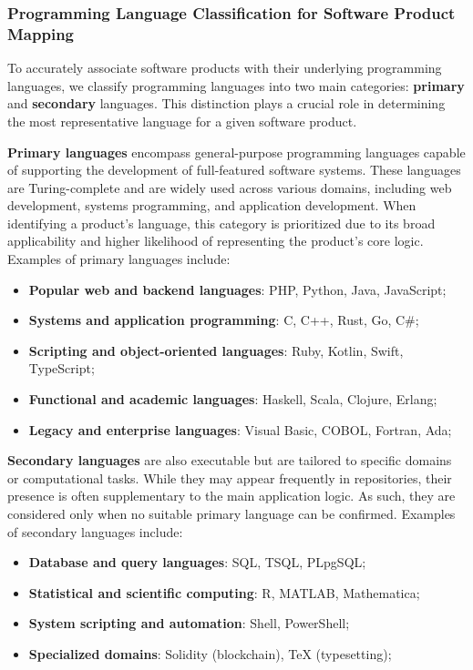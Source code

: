\subsubsection{Programming Language Classification for Software Product Mapping}
To accurately associate software products with their underlying programming languages, we classify programming languages into two main categories: \textbf{primary} and \textbf{secondary} languages. This distinction plays a crucial role in determining the most representative language for a given software product.

\textbf{Primary languages} encompass general-purpose programming languages capable of supporting the development of full-featured software systems. These languages are Turing-complete and are widely used across various domains, including web development, systems programming, and application development. When identifying a product's language, this category is prioritized due to its broad applicability and higher likelihood of representing the product's core logic. Examples of primary languages include: 

\begin{itemize}
    \item \textbf{Popular web and backend languages}: PHP, Python, Java, JavaScript;
    \item \textbf{Systems and application programming}: C, C++, Rust, Go, C\#;
    \item \textbf{Scripting and object-oriented languages}: Ruby, Kotlin, Swift, TypeScript;
    \item \textbf{Functional and academic languages}: Haskell, Scala, Clojure, Erlang;
    \item \textbf{Legacy and enterprise languages}: Visual Basic, COBOL, Fortran, Ada;
\end{itemize}

\textbf{Secondary languages} are also executable but are tailored to specific domains or computational tasks. While they may appear frequently in repositories, their presence is often supplementary to the main application logic. As such, they are considered only when no suitable primary language can be confirmed. Examples of secondary languages include:

\begin{itemize}
    \item \textbf{Database and query languages}: SQL, TSQL, PLpgSQL;
    \item \textbf{Statistical and scientific computing}: R, MATLAB, Mathematica;
    \item \textbf{System scripting and automation}: Shell, PowerShell;
    \item \textbf{Specialized domains}: Solidity (blockchain), TeX (typesetting);
\end{itemize}

